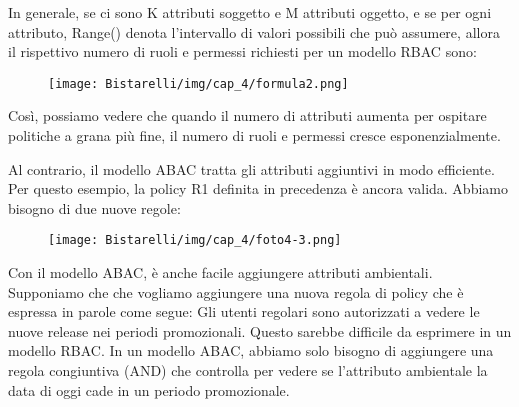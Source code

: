 In generale, se ci sono K attributi soggetto e M attributi oggetto, e se per ogni attributo, Range() denota l'intervallo di valori possibili che può assumere, allora il rispettivo numero di ruoli e permessi richiesti per un modello RBAC sono:

\begin{figure}[H]
	\centering
    \texttt{[image: Bistarelli/img/cap\_4/formula2.png]}
\end{figure}

Così, possiamo vedere che quando il numero di attributi aumenta per ospitare politiche a grana più fine, il numero di ruoli e permessi cresce esponenzialmente.

Al contrario, il modello ABAC tratta gli attributi aggiuntivi in modo efficiente. Per questo esempio, la policy R1 definita in precedenza è ancora valida. Abbiamo bisogno di due nuove regole:

\begin{figure}[H]
	\centering
    \texttt{[image: Bistarelli/img/cap\_4/foto4-3.png]}
\end{figure}

Con il modello ABAC, è anche facile aggiungere attributi ambientali. Supponiamo che che vogliamo aggiungere una nuova regola di policy che è espressa in parole come segue: Gli utenti regolari sono autorizzati a vedere le nuove release nei periodi promozionali. Questo sarebbe difficile da esprimere in un modello RBAC. In un modello ABAC, abbiamo solo bisogno di aggiungere una regola congiuntiva (AND) che controlla per vedere se l'attributo ambientale la data di oggi cade in un periodo promozionale.

\newpage

